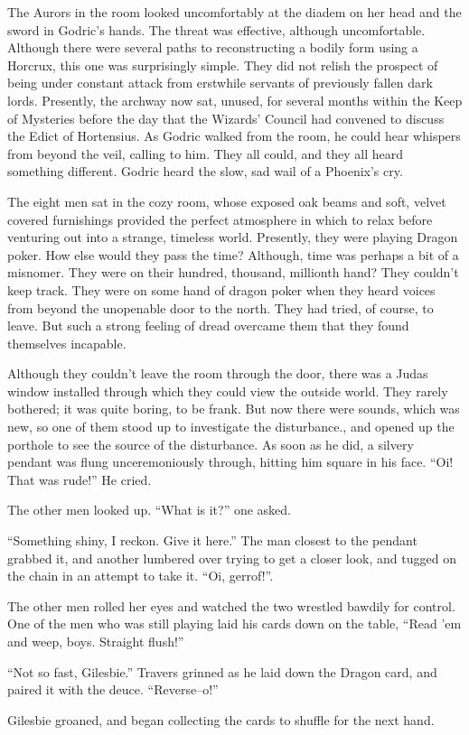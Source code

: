 The Aurors in the room looked uncomfortably at the diadem on her head and the sword in Godric’s hands. The threat was effective, although uncomfortable. Although there were several paths to reconstructing a bodily form using a Horcrux, this one was surprisingly simple. They did not relish the prospect of being under constant attack from erstwhile servants of previously fallen dark lords.
\SmallVSpace
Presently, the archway now sat, unused, for several months within the Keep of Mysteries before the day that the Wizards’ Council had convened to discuss the Edict of Hortensius. As Godric walked from the room, he could hear whispers from beyond the veil, calling to him. They all could, and they all heard something different.
\SmallVSpace
Godric heard the slow, sad wail of a Phoenix’s cry.
\simpleline	

\begin{flushright}
The eight men sat in the cozy room, whose exposed oak beams and soft, velvet covered furnishings provided the perfect atmosphere in which to relax before venturing out into a strange, timeless world. Presently, they were playing Dragon poker. How else would they pass the time? Although, time was perhaps a bit of a misnomer. They were on their hundred, thousand, millionth hand? They couldn’t keep track. They were on some hand of dragon poker when they heard voices from beyond the unopenable door to the north. They had tried, of course, to leave. But such a strong feeling of dread overcame them that they found themselves incapable.

Although they couldn’t leave the room through the door, there was a Judas window installed through which they could view the outside world. They rarely bothered; it was quite boring, to be frank. But now there were sounds, which was new, so one of them stood up to investigate the disturbance., and opened up the porthole to see the source of the disturbance. As soon as he did, a silvery pendant was flung unceremoniously through, hitting him square in his face.
\SmallVSpace
“Oi! That was rude!” He cried.

The other men looked up. “What is it?” one asked.

“Something shiny, I reckon. Give it here.” The man closest to the pendant grabbed it, and another lumbered over trying to get a closer look, and tugged on the chain in an attempt to take it. “Oi, gerrof!”.

The other men rolled her eyes and watched the two wrestled bawdily for control. One of the men who was still playing laid his cards down on the table, “Read ’em and weep, boys. Straight flush!”

“Not so fast, Gilesbie.” Travers grinned as he laid down the Dragon card, and paired it with the deuce. “Reverse\mbox{--}o!”

Gilesbie groaned, and began collecting the cards to shuffle for the next hand. 
\simpleline
\end{flushright}

